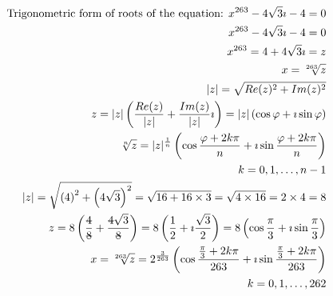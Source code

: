 \documentclass{article}
\newcommand{\stkout}[1]{\ifmmode\text{\sout{\ensuremath{#1}}}\else\sout{#1}\fi}
\begin{document}
    \begin{align*}
        \text{Trigonometric form of roots of the equation: } x ^ {263} - 4\sqrt3\imath -4 = 0\\
            x ^ {263} - 4\sqrt3\imath -4 = 0\\
            x ^ {263} = 4 + 4\sqrt3\imath = z\\
            x = \sqrt[263]{z}\\
            |z| = \sqrt{Re(z) ^ {2} + Im(z) ^ {2}}\\
            z  = |z|\left(\frac{ Re(z) }{|z|} + \frac{Im(z)}{|z|}\imath\right) = |z|\left(\cos\varphi + \imath\sin\varphi\right)\\
            \sqrt[n]{z}  = |z| ^ \frac{1}{n}\left(\cos{\frac{\varphi + 2k\pi}{n}} + \imath\sin{\frac{\varphi + 2k\pi}{n}}\right)\\
            k = 0, 1, \dots, n - 1\\
            |z| = \sqrt{\left(4\right)^2 + \left(4\sqrt3\right) ^ 2}
            = \sqrt{16 + 16 \times 3}
            = \sqrt{4 \times 16} = 2 \times 4 = 8\\
            z = 8\left(\frac{\stkout{4}}{\stkout{8}} + \frac{\stkout{4}\sqrt3}{\stkout{8}}\right)
            = 8\left(\frac{1}{2} + \imath\frac{\sqrt3}{2}\right)
            = 8\left(\cos\frac{\pi}{3} + \imath\sin\frac{\pi}{3}\right)\\
            x = \sqrt[263]{z} = 2 ^ {\frac{3}{263}}\left(\cos{\frac{\frac{\pi}{3} + 2k\pi}{263}} + \imath\sin{\frac{\frac{\pi}{3} + 2k\pi}{263}}\right)\\
            k = 0, 1, \dots, 262\\
    \end{align*}
\end{document}
